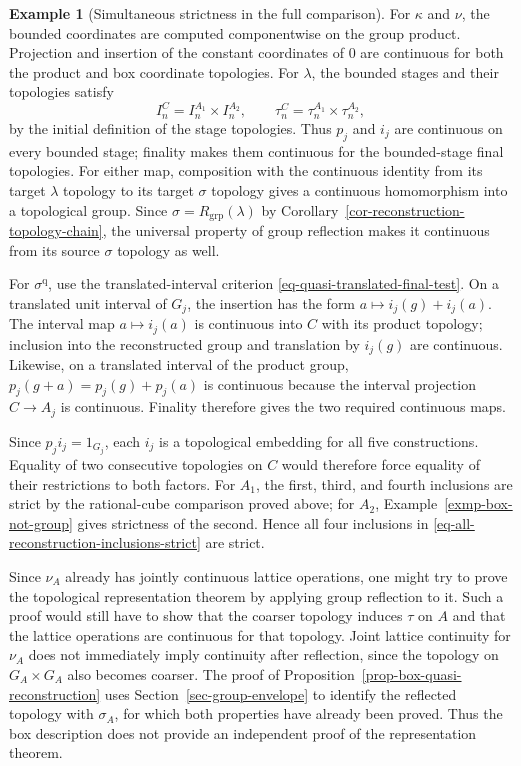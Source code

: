 \documentclass[preprint,3p]{elsarticle}
\theoremstyle{plain}
\theoremstyle{definition}
\newtheorem{exmp}[thm]{Example}
\numberwithin{equation}{section}
\begin{document}
\begin{exmp}[Simultaneous strictness in the full comparison]
For $\kappa$ and $\nu$, the bounded coordinates are computed
componentwise on the group product.
Projection and insertion of the constant coordinates of $0$ are
continuous for both the product and box coordinate topologies.
For $\lambda$, the bounded stages and their topologies satisfy
\[
 I_n^C=I_n^{A_1}\times I_n^{A_2},\qquad
 \tau_n^C=\tau_n^{A_1}\times\tau_n^{A_2},
\]
by the initial definition of the stage topologies.
Thus $p_j$ and $i_j$ are continuous on every bounded stage;
finality makes them continuous for the bounded-stage final
topologies.  For either map, composition with the continuous identity
from its target $\lambda$ topology to its target $\sigma$ topology
gives a continuous homomorphism into a topological group.
Since $\sigma=R_{\mathrm{grp}}(\lambda)$ by
Corollary~\ref{cor-reconstruction-topology-chain}, the universal
property of group reflection makes it continuous from its source
$\sigma$ topology as well.

For $\sigma^{\mathrm q}$, use the translated-interval criterion
\eqref{eq-quasi-translated-final-test}.
On a translated unit interval of $G_j$, the insertion has the form
$a\mapsto i_j(g)+i_j(a)$.
The interval map $a\mapsto i_j(a)$ is continuous into $C$ with
its product topology; inclusion into the reconstructed group
and translation by $i_j(g)$ are continuous.
Likewise, on a translated interval of the product group,
$p_j(g+a)=p_j(g)+p_j(a)$ is continuous because the interval
projection $C\longrightarrow A_j$ is continuous.
Finality therefore gives the two required continuous maps.

Since $p_ji_j=1_{G_j}$, each $i_j$ is a topological embedding
for all five constructions.  Equality of two consecutive
topologies on $C$ would therefore force equality of their
restrictions to both factors.
For $A_1$, the first, third, and fourth inclusions are strict
by the rational-cube comparison proved above; for $A_2$,
Example~\ref{exmp-box-not-group} gives strictness of the second.
Hence all four inclusions in
\eqref{eq-all-reconstruction-inclusions-strict} are strict.
\end{exmp}

Since $\nu_A$ already has jointly continuous lattice operations,
one might try to prove the topological representation theorem by
applying group reflection to it.  Such a proof would still have to
show that the coarser topology induces $\tau$ on $A$ and that the
lattice operations are continuous for that topology.
Joint lattice continuity for $\nu_A$ does not immediately imply
continuity after reflection, since the topology on $G_A\times G_A$
also becomes coarser.
The proof of Proposition~\ref{prop-box-quasi-reconstruction} uses
Section~\ref{sec-group-envelope} to identify the reflected topology
with $\sigma_A$, for which both properties have already been proved.
Thus the box description does not provide an independent proof
of the representation theorem.
\end{document}
